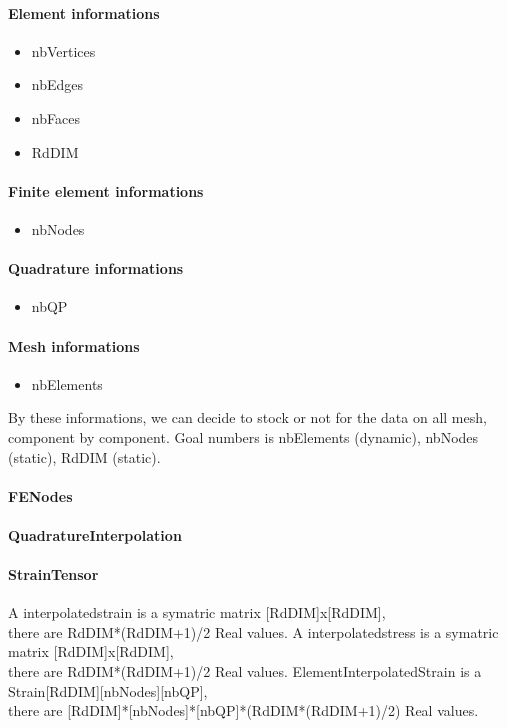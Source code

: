 \documentclass[a4paper,10pt]{article}
\begin{document}
\paragraph{Element informations }
\begin{itemize}
\item nbVertices
\item nbEdges
\item nbFaces
\item RdDIM
\end{itemize}
\paragraph{Finite element informations }
\begin{itemize}
\item nbNodes
\end{itemize}
\paragraph{Quadrature informations }
\begin{itemize}
\item nbQP 
\end{itemize}
\paragraph{Mesh informations }
\begin{itemize}
\item nbElements
\end{itemize}
By these informations, we can decide to stock or not for the data on all mesh, component by component. Goal numbers is nbElements (dynamic), nbNodes (static), RdDIM (static).
\paragraph{FENodes }
\paragraph{QuadratureInterpolation }
\paragraph{StrainTensor }
A interpolatedstrain is a symatric matrix [RdDIM]x[RdDIM], \\ there are RdDIM*(RdDIM+1)/2 Real values.
A interpolatedstress is a symatric matrix [RdDIM]x[RdDIM], \\ there are RdDIM*(RdDIM+1)/2 Real values.
ElementInterpolatedStrain is a \\ Strain[RdDIM][nbNodes][nbQP], \\ there are [RdDIM]*[nbNodes]*[nbQP]*(RdDIM*(RdDIM+1)/2) Real values.
\end{document}
